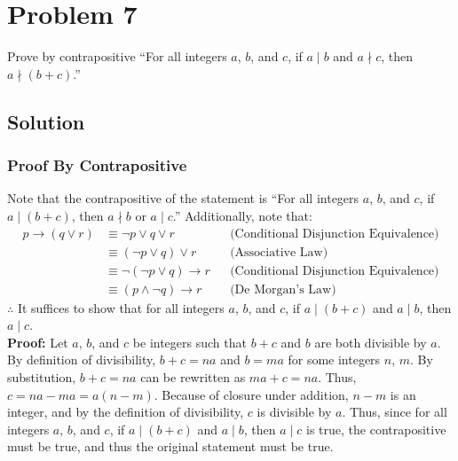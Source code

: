 \documentclass[table]{article}
\begin{document}
\section{Problem 7}
Prove by contrapositive ``For all integers $a$, $b$, and $c$, if $a \mid b$ and $a \nmid c$, then $a \nmid (b + c)$.''
\large
\subsection{Solution}
\subsubsection{Proof By Contrapositive}
Note that the contrapositive of the statement is ``For all integers $a$, $b$, and $c$, if $a \mid (b + c)$, then $a \nmid b$ or $a \mid c$.'' Additionally, note that:
\begin{align*}
p \rightarrow (q \lor r) &\equiv \neg p \lor q \lor r && \text{(Conditional Disjunction Equivalence)}\\
&\equiv (\neg p \lor q) \lor r && \text{(Associative Law)}\\
&\equiv \neg (\neg p \lor q) \rightarrow r && \text{(Conditional Disjunction Equivalence)}\\
&\equiv (p \land \neg q) \rightarrow r && \text{(De Morgan's Law)}
\end{align*}
$\therefore$ It suffices to show that for all integers $a$, $b$, and $c$, if $a \mid (b+c)$ and $a \mid b$, then $a \mid c$.\\
\textbf{Proof:} Let $a$, $b$, and $c$ be integers such that $b+c$ and $b$ are both divisible by $a$. By definition of divisibility, $b + c = na$ and $b = ma$ for some integers $n$, $m$. By substitution, $b + c = na$ can be rewritten as $ma + c = na$. Thus, $c = na - ma = a(n - m)$. Because of closure under addition, $n - m$ is an integer, and by the definition of divisibility, $c$ is divisible by $a$. Thus, since for all integers $a$, $b$, and $c$, if $a \mid (b+c)$ and $a \mid b$, then $a \mid c$ is true, the contrapositive must be true, and thus the original statement must be true.
\end{document}
